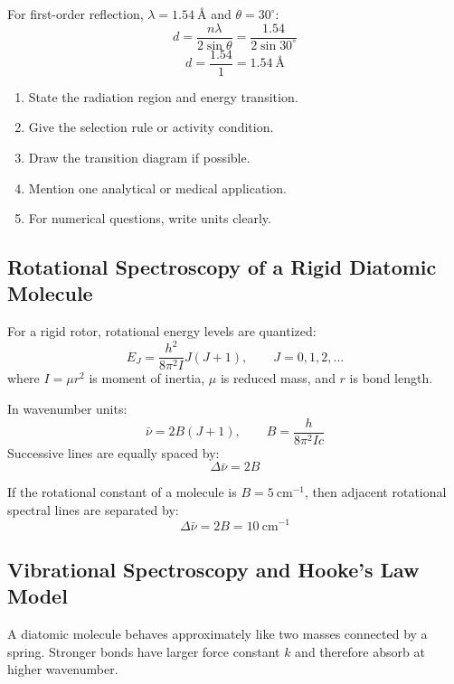 \documentclass[12pt,a4paper]{article}
\begin{document}
\begin{tcolorbox}[examplebox, title={Solved Example: Crystal Plane Spacing}]
For first-order reflection, $\lambda=1.54\ \text{\AA}$ and $\theta=30^\circ$:
\[
d=\frac{n\lambda}{2\sin\theta}=\frac{1.54}{2\sin30^\circ}
\]
\[
d=\frac{1.54}{1}=1.54\ \text{\AA}
\]
\end{tcolorbox}

\begin{tcolorbox}[masonbox, title={Answer-Writing Pattern for Spectroscopy}]
\begin{enumerate}[leftmargin=*, itemsep=3pt, topsep=2pt]
  \item State the radiation region and energy transition.
  \item Give the selection rule or activity condition.
  \item Draw the transition diagram if possible.
  \item Mention one analytical or medical application.
  \item For numerical questions, write units clearly.
\end{enumerate}
\end{tcolorbox}

\subsection{Rotational Spectroscopy of a Rigid Diatomic Molecule}
For a rigid rotor, rotational energy levels are quantized:
\[
E_J=\frac{h^2}{8\pi^2I}J(J+1),\qquad J=0,1,2,\ldots
\]
where $I=\mu r^2$ is moment of inertia, $\mu$ is reduced mass, and $r$ is bond length.

\begin{tcolorbox}[formulabox, title={Rotational Spectral Lines}]
In wavenumber units:
\[
\bar{\nu}=2B(J+1),\qquad B=\frac{h}{8\pi^2Ic}
\]
Successive lines are equally spaced by:
\[
\Delta\bar{\nu}=2B
\]
\end{tcolorbox}

\begin{tcolorbox}[examplebox, title={Solved Example: Rotational Line Spacing}]
If the rotational constant of a molecule is $B=5\ \mathrm{cm^{-1}}$, then adjacent rotational spectral lines are separated by:
\[
\Delta\bar{\nu}=2B=10\ \mathrm{cm^{-1}}
\]
\end{tcolorbox}

\subsection{Vibrational Spectroscopy and Hooke's Law Model}
A diatomic molecule behaves approximately like two masses connected by a spring. Stronger bonds have larger force constant $k$ and therefore absorb at higher wavenumber.
\end{document}
